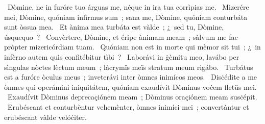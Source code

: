 ~Dòmine, ne in furóre tuo árguas me, néque in ira tua corrìpias me. 
~Mizerére mei, Dòmine, quóniam infìrmus sum~; sana me, Dòmine, quóniam conturbáta sunt òssua mea. 
~Et ànima mea turbáta est vàlde~; ¿~sed tu, Dòmine, úsquequo~? 
~Convèrtere, Dòmine, et éripe ànimam meam~; sàlvum me fac pròpter mizericórdiam tuam. 
~Quóniam non est in morte qui mèmor sit tui~; ¿~in infèrno autem quìs confitébitur tìbi~? 
~Laborávi in ġèmitu meo, lavábo per sìngulas nòctes lèctum meum~; làcrymïs meïs stratum meum rigábo. 
~Turbátus est a furóre òculus meus~; inveterávi inter òmnes inimícos meos. 
~Disċédite a me òmnes qui operámini iniquitátem, quóniam exaudívit Dòminus voċem fletüs mei. 
~Exaudívit Dòminus deprecaçiónem meam~; Dòminus oraçiónem meam susċépit. 
~Erubéscant et conturbèntur vehemènter, òmnes inimíci mei~; convertàntur et erubéscant vàlde velóċiter. 
